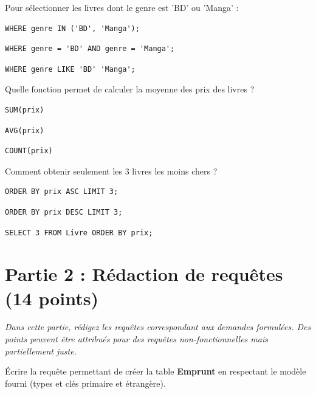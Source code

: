 \documentclass[a4paper, noanswers, addpoints, 12pt]{exam}
\begin{document}
\begin{questions}
\question[1] Pour sélectionner les livres dont le genre est 'BD' ou 'Manga' :
\begin{choices}
    \choice \begin{verbatim}
WHERE genre IN ('BD', 'Manga');
\end{verbatim}
    \choice \begin{verbatim}
WHERE genre = 'BD' AND genre = 'Manga';
\end{verbatim}
    \choice \begin{verbatim}
WHERE genre LIKE 'BD' 'Manga';
\end{verbatim}
\end{choices}

\question[1] Quelle fonction permet de calculer la moyenne des prix des livres ?
\begin{choices}
    \choice \begin{verbatim}
SUM(prix)
\end{verbatim}
    \choice \begin{verbatim}
AVG(prix)
\end{verbatim}
    \choice \begin{verbatim}
COUNT(prix)
\end{verbatim}
\end{choices}

\question[1] Comment obtenir seulement les 3 livres les moins chers ?
\begin{choices}
    \choice \begin{verbatim}
ORDER BY prix ASC LIMIT 3;
\end{verbatim}
    \choice \begin{verbatim}
ORDER BY prix DESC LIMIT 3;
\end{verbatim}
    \choice \begin{verbatim}
SELECT 3 FROM Livre ORDER BY prix;
\end{verbatim}
\end{choices}

\newpage

\section{Partie 2 : Rédaction de requêtes (14 points)}
\textit{Dans cette partie, rédigez les requêtes correspondant aux demandes formulées. Des points peuvent être attribués pour des requêtes non-fonctionnelles mais partiellement juste.}

\question[2] Écrire la requête permettant de créer la table \textbf{Emprunt} en respectant le modèle fourni (types et clés primaire et étrangère).
\vspace{4cm}


\end{questions}
\end{document}
